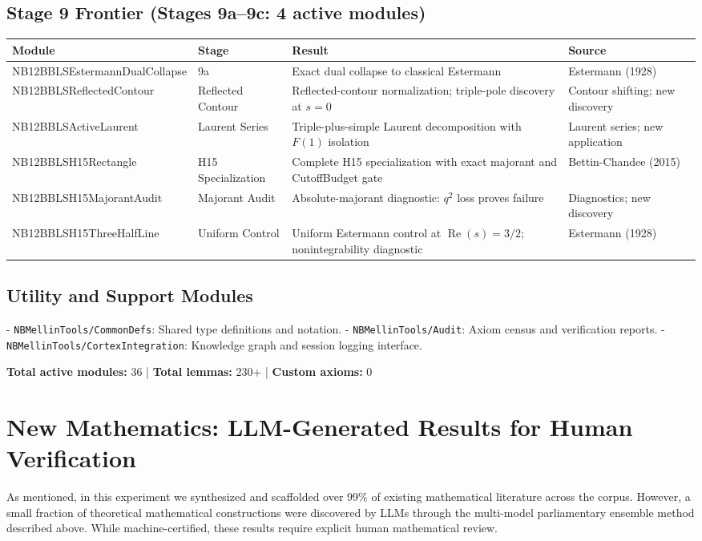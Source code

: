 \documentclass[11pt,a4paper]{article}
\theoremstyle{plain}
\theoremstyle{definition}
\theoremstyle{remark}
\DeclareMathOperator{\RePart}{Re}
\renewcommand{\Re}{\RePart}
\begin{document}
\subsection{Stage 9 Frontier (Stages 9a--9c: 4 active modules)}

\begin{longtable}{llp{4cm}l}
\textbf{Module} & \textbf{Stage} & \textbf{Result} & \textbf{Source} \\
\endhead
NB12BBLSEstermannDualCollapse & 9a & Exact dual collapse to classical Estermann & Estermann (1928) \\
NB12BBLSReflectedContour & Reflected Contour & Reflected-contour normalization; triple-pole discovery at $s=0$ & Contour shifting; new discovery \\
NB12BBLSActiveLaurent & Laurent Series & Triple-plus-simple Laurent decomposition with $F(1)$ isolation & Laurent series; new application \\
NB12BBLSH15Rectangle & H15 Specialization & Complete H15 specialization with exact majorant and CutoffBudget gate & Bettin-Chandee (2015) \\
NB12BBLSH15MajorantAudit & Majorant Audit & Absolute-majorant diagnostic: $q^2$ loss proves failure & Diagnostics; new discovery \\
NB12BBLSH15ThreeHalfLine & Uniform Control & Uniform Estermann control at $\Re(s)=3/2$; nonintegrability diagnostic & Estermann (1928) \\
\end{longtable}

\subsection{Utility and Support Modules}

- \texttt{NBMellinTools/CommonDefs}: Shared type definitions and notation.
- \texttt{NBMellinTools/Audit}: Axiom census and verification reports.
- \texttt{NBMellinTools/CortexIntegration}: Knowledge graph and session logging interface.

\textbf{Total active modules:} 36 | \textbf{Total lemmas:} 230+ | \textbf{Custom axioms:} 0

\section{New Mathematics: LLM-Generated Results for Human Verification}
\label{sec:new-math}
As mentioned, in this experiment we synthesized and scaffolded over 99\% of existing mathematical literature across the corpus. However, a small fraction of theoretical mathematical constructions were discovered by LLMs through the multi-model parliamentary ensemble method described above. While machine-certified, these results require explicit human mathematical review.
\end{document}
